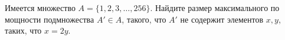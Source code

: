 \documentclass{article}
\begin{document}
Имеется множество $A=\{1,2,3,\ldots,256\}$. Найдите размер максимального по мощности подмножества $A' \in A$, такого, что $A'$ не содержит элементов $x,y$, таких, что $x=2y$.
\end{document}
